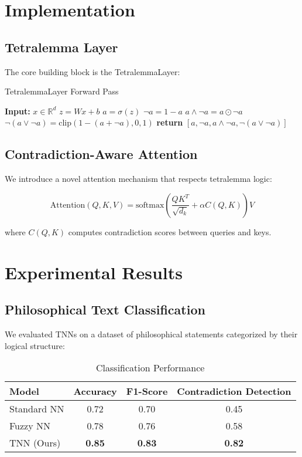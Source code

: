 \documentclass[10pt,journal,compsoc]{IEEEtran}
\begin{document}
\section{Implementation}
\subsection{Tetralemma Layer}
The core building block is the TetralemmaLayer:

\begin{algorithm}[H]
\caption{TetralemmaLayer Forward Pass}
\begin{algorithmic}[1]
\STATE \textbf{Input:} $x \in \mathbb{R}^d$
\STATE $z = Wx + b$
\STATE $a = \sigma(z)$
\STATE $\neg a = 1 - a$
\STATE $a \wedge \neg a = a \odot \neg a$
\STATE $\neg(a \vee \neg a) = \text{clip}(1-(a+\neg a), 0, 1)$
\STATE \textbf{return} $[a, \neg a, a \wedge \neg a, \neg(a \vee \neg a)]$
\end{algorithmic}
\end{algorithm}

\subsection{Contradiction-Aware Attention}
We introduce a novel attention mechanism that respects tetralemma logic:

\begin{equation}
\text{Attention}(Q,K,V) = \text{softmax}\left(\frac{QK^T}{\sqrt{d_k}} + \alpha C(Q,K)\right)V
\end{equation}

where $C(Q,K)$ computes contradiction scores between queries and keys.

\section{Experimental Results}
\subsection{Philosophical Text Classification}
We evaluated TNNs on a dataset of philosophical statements categorized by their logical structure:

\begin{table}[h]
\caption{Classification Performance}
\begin{center}
\begin{tabular}{|l|c|c|c|}
\hline
\textbf{Model} & \textbf{Accuracy} & \textbf{F1-Score} & \textbf{Contradiction Detection} \\
\hline
Standard NN & 0.72 & 0.70 & 0.45 \\
Fuzzy NN & 0.78 & 0.76 & 0.58 \\
TNN (Ours) & \textbf{0.85} & \textbf{0.83} & \textbf{0.82} \\
\hline
\end{tabular}
\end{center}
\end{table}
\end{document}

